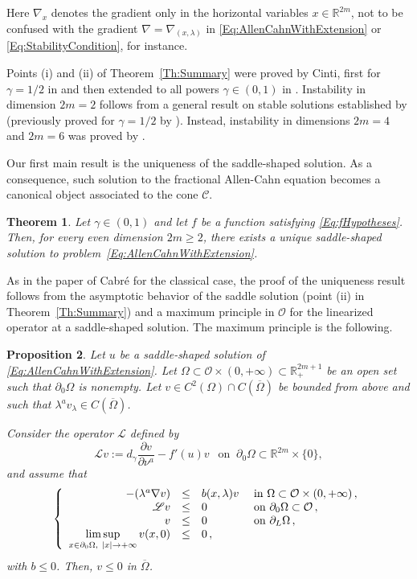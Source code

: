 \documentclass[12pt,reqno]{amsart}
\newtheorem{theorem}{Theorem}[section]
\newtheorem{proposition}[theorem]{Proposition}
\theoremstyle{definition}
\theoremstyle{remark}
\newcommand{\con}[1]{\mathbb{#1}}
\newcommand{\R}{\con{R}} %
\newcommand{\ccal}{\mathscr{C}}
\newcommand{\ocal}{\mathcal{O}}
\newcommand{\s}{\gamma}
\newcommand\beqc[1]{\left\{\begin{array}{#1}}
\newcommand\eeqc{\end{array} \right.}
\def\PDEsystem{rcll}
\let\div\relax
\DeclareMathOperator{\div}{div}
\def\ds{\displaystyle}
\numberwithin{equation}{section}
\begin{document}
Here $\nabla_x$ denotes the gradient only in the horizontal variables $x\in \R^{2m}$, not to be confused with the gradient $\nabla = \nabla_{(x,\lambda)}$ in \eqref{Eq:AllenCahnWithExtension} or \eqref{Eq:StabilityCondition}, for instance.

Points (i) and (ii) of Theorem~\ref{Th:Summary} were proved by Cinti, first for $\s = 1/2$  in \cite{Cinti-Saddle} and then extended to all powers $\s \in (0,1)$ in \cite{Cinti-Saddle2}. Instability in dimension $2m = 2$ follows from a general result on stable solutions established by \cite{CabreSireII} (previously proved for $\s = 1/2$ by \cite{CabreSolaMorales}). Instead, instability in dimensions $2m=4$ and $2m=6$ was proved by \cite{Cinti-Saddle,Cinti-Saddle2}.


Our first main result is the uniqueness of the saddle-shaped solution. As a consequence, such solution to the fractional Allen-Cahn equation becomes a canonical object associated to the cone $\ccal$.

\begin{theorem}
\label{Thm:Uniqueness}
Let $\s \in (0,1)$  and let $f$ be a function satisfying \eqref{Eq:fHypotheses}. Then, for every even dimension $2m\geq 2$, there exists a unique saddle-shaped solution to problem~\eqref{Eq:AllenCahnWithExtension}.
\end{theorem}

As in the paper of Cabré \cite{Cabre-Saddle} for the classical case, the proof of the uniqueness result follows from the asymptotic behavior of the saddle solution (point (ii) in Theorem~\ref{Th:Summary}) and a maximum principle in $\ocal$ for the linearized operator at a saddle-shaped solution. The maximum principle is the following.

\begin{proposition}
\label{Prop:MaxPrincipleLinearizedOperator}
Let $u$ be a saddle-shaped solution of \eqref{Eq:AllenCahnWithExtension}. 
Let $\Omega \subset \ocal \times (0,+\infty) \subset \R^{2m+1}_+$ be an open set such that $\partial_0 \Omega$ is nonempty. Let $v \in C^2 (\Omega)\cap C(\overline{\Omega})$ be bounded from above and such that $\lambda^a v_\lambda \in C(\overline{\Omega})$. 

Consider the operator $\mathscr{L}$ defined by 
\begin{equation}
\label{Eq:LinearizedOperator}
\mathscr{L}v := d_\s \dfrac{\partial v}{\partial \nu^a}  -f'(u) v \ \ \text{ on } \ \partial_0 \Omega \subset \R^{2m}\times\{0\},
\end{equation}
and assume that
$$
\beqc{\PDEsystem}
-\div(\lambda^a \nabla v) &\leq& b(x,\lambda) v & \text{ in } \Omega \subset \ocal \times (0,+\infty)\,, \\
\mathscr{L}v &\leq & 0 & \text{ on } \partial_0 \Omega \subset \ocal \,, \\
v & \leq & 0 & \text{ on } \partial_L \Omega \,,\\
\ds \limsup_{x\in \partial_0 \Omega, \  |x|\to +\infty} v(x,0) & \leq & 0\,,
\eeqc
$$
with $b \leq 0$. Then, $v\leq 0$ in $\overline{\Omega}$.
\end{proposition}
\end{document}
